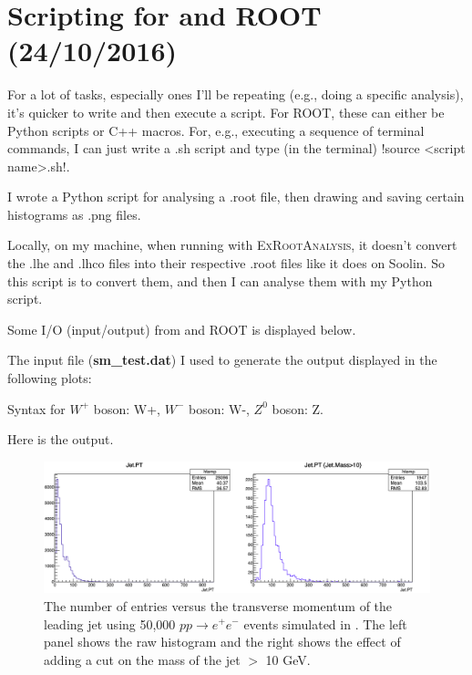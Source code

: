\newpage
\chapter{Scripting for \madgraph and ROOT (24/10/2016)}

For a lot of tasks, especially ones I'll be repeating (e.g., doing a specific analysis), it's quicker to write and then execute a script. For ROOT, these can either be Python scripts or C++ macros. For, e.g., executing a sequence of terminal commands, I can just write a .sh script and type (in the terminal) !source <script name>.sh!.

I wrote a Python script for analysing a .root file, then drawing and saving certain histograms as .png files.



Locally, on my machine, when running \madgraph with \textsc{ExRootAnalysis}, it doesn't convert the .lhe and .lhco files into their respective .root files like it does on Soolin. So this script is to convert them, and then I can analyse them with my Python script.



Some I/O (input/output) from \madgraph and ROOT is displayed below.

The input file (\textbf{sm\_test.dat}) I used to generate the output displayed in the following plots:



Syntax for $W^+$ boson: W+, $W^-$ boson: W-, $Z^0$ boson: Z.

Here is the output.

\begin{figure}[H]
\centering
\includegraphics[width=\textwidth]{./sec10/JetPT.png}
\caption{The number of entries versus the transverse momentum of the leading jet using 50,000 $pp \rightarrow e^+ e^-$ events simulated in \madgraph. The left panel shows the raw histogram and the right shows the effect of adding a cut on the mass of the jet $>$ 10 GeV.}
\end{figure}

